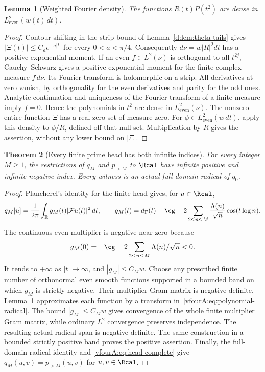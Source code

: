 \documentclass[11pt,a4paper]{article}
\numberwithin{equation}{section}
\newtheorem{theorem}{Theorem}[section]
\newtheorem{lemma}[theorem]{Lemma}
\theoremstyle{definition}\newtheorem{definition}[theorem]{Definition}
\theoremstyle{remark}\newtheorem{remark}[theorem]{Remark}
\newcommand{\R}{\mathbb R}\newcommand{\C}{\mathbb C}\newcommand{\N}{\mathbb N}
\begin{document}
\begin{lemma}[Weighted Fourier density]\label{vfourA:lem:density}
The functions $R(t)P(t^2)$ are dense in $L^2_{\mathrm{even}}(w(t)\,dt)$.
\end{lemma}
\begin{proof}
Contour shifting in the strip bound of
Lemma~\ref{d:lem:theta-tails} gives
$|\Xi(t)|\le C_a e^{-a|t|}$ for every $0<a<\pi/4$.  Consequently
$d\nu=w|R|^2dt$ has a positive exponential moment.  If an even
$f\in L^2(\nu)$ is orthogonal to all $t^{2j}$, Cauchy--Schwarz gives
a positive exponential moment for the finite complex measure
$f\,d\nu$.  Its Fourier transform is holomorphic on a strip.  All
derivatives at zero vanish, by orthogonality for the even derivatives
and parity for the odd ones.  Analytic continuation and uniqueness of
the Fourier transform of a finite measure imply $f=0$.  Hence the
polynomials in $t^2$ are dense in $L^2_{\mathrm{even}}(\nu)$.
The nonzero entire function $\Xi$ has a real zero set of measure zero.
For $\phi\in L^2_{\mathrm{even}}(w\,dt)$, apply this density to
$\phi/R$, defined off that null set.  Multiplication by $R$ gives
the assertion, without any lower bound on $|\Xi|$.
\end{proof}

\begin{theorem}[Every finite prime head has both infinite indices]
\label{vfourA:thm:indices}
For every integer $M\ge1$, the restrictions of $q_M$ and $p_{>M}$ to
$\Rcal$ have infinite positive and infinite negative index.  Every
witness is an actual full-domain radical of $q_0$.
\end{theorem}
\begin{proof}
Plancherel's identity for the finite head gives, for $u\in\Rcal$,
\begin{equation}\label{vfourA:eq:head-multiplier}
 q_M[u]=\frac1{2\pi}\int_\R g_M(t)|\mathcal Fu(t)|^2\,dt,
 \qquad
 g_M(t)=d_\Gamma(t)-\cg
        -2\sum_{2\le n\le M}\frac{\Lambda(n)}{\sqrt n}\cos(t\log n).
\end{equation}
The continuous even multiplier is negative near zero because
\[
 g_M(0)=-\cg-2\sum_{2\le n\le M}\Lambda(n)/\sqrt n<0.
\]
It tends to $+\infty$ as $|t|\to\infty$, and $|g_M|\le C_Mw$.
Choose any prescribed finite number of orthonormal even smooth
functions supported in a bounded band on which $g_M$ is strictly
negative.  Their multiplier Gram matrix is negative definite.
Lemma~\ref{vfourA:lem:density} approximates each function by a transform
in~\eqref{vfourA:eq:polynomial-radical}.  The bound $|g_M|\le C_Mw$
gives convergence of the whole finite multiplier Gram matrix, while
ordinary $L^2$ convergence preserves independence.  The resulting
actual radical span is negative definite.  The same construction in
a bounded strictly positive band proves the positive assertion.
Finally, the full-domain radical identity and
\eqref{vfourA:eq:head-complete} give
$q_M(u,v)=p_{>M}(u,v)$ for $u,v\in\Rcal$.
\end{proof}
\end{document}
